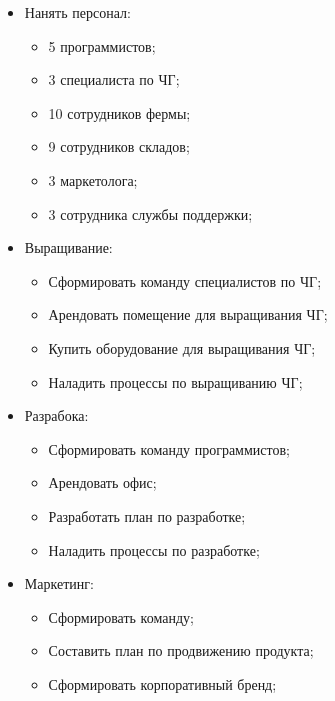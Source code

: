\documentclass[a4paper,8pt]{article}
\begin{document}
    \begin{itemize}

        \item Нанять персонал:
            \begin{itemize}
                \item 5 программистов;
                \item 3 специалиста по ЧГ;
                \item 10 сотрудников фермы;
                \item 9 сотрудников складов;
                \item 3 маркетолога;
                \item 3 сотрудника службы поддержки;
            \end{itemize}

        \item Выращивание:
            \begin{itemize}
                \item Сформировать команду специалистов по ЧГ;
                \item Арендовать помещение для выращивания ЧГ;
                \item Купить оборудование для выращивания ЧГ;
                \item Наладить процессы по выращиванию ЧГ;
            \end{itemize}

        \item Разрабока:
            \begin{itemize}
                \item Сформировать команду программистов;
                \item Арендовать офис;
                \item Разработать план по разработке;
                \item Наладить процессы по разработке;
            \end{itemize}

        \item Маркетинг:
            \begin{itemize}
                \item Сформировать команду;
                \item Составить план по продвижению продукта;
                \item Сформировать корпоративный бренд;
            \end{itemize}


\end{itemize}
\end{document}
